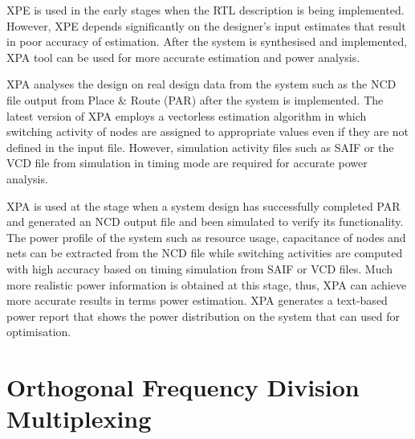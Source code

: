 XPE is used in the early stages when the RTL description is being implemented.
However, XPE depends significantly on the designer's input estimates that result in poor accuracy of estimation.
After the system is synthesised and implemented, XPA tool can be used for more accurate estimation and power analysis.

XPA analyses the design on real design data from the system such as the NCD file output from Place \& Route (PAR) after the system is implemented.
The latest version of XPA employs a vectorless estimation algorithm in which switching activity of nodes are assigned to appropriate values even if they are not defined in the input file.
However, simulation activity files such as SAIF or the VCD file from simulation in timing mode are required for accurate power analysis.

XPA is used at the stage when a system design has successfully completed PAR and generated an NCD output file and been simulated to verify its functionality.
The power profile of the system such as resource usage, capacitance of nodes and nets can be extracted from the NCD file while switching activities are computed with high accuracy based on timing simulation from SAIF or VCD files. Much more realistic power information is obtained at this stage, thus, XPA can achieve more accurate results in terms power estimation.
XPA generates a text-based power report that shows the power distribution on the system that can used for optimisation.


\section{Orthogonal Frequency Division Multiplexing}

